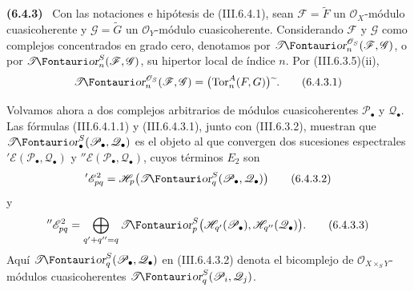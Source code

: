 \documentclass[10pt,oneside]{book}
\makeatletter
\newcommand{\sh}[1]{\mathscr{#1}}
\newcommand*{\ega@sheafop}[3]{\sh{#1}#2\textup{\kern-2.2pt{\Fontauri\slshape #3}}}
\newcommand{\shTor}{\ega@sheafop{T}{}{or}}
\newcommand{\supertilde}{{\,\widetilde{\,}\,}}
\newcommand{\Tor}{\operatorname{Tor}}
\newcommand{\sref}[2][]{\textup{(#2)}}
\newenvironment{env}[1][]{\par\medskip\noindent\textbf{(#1)}\ }{\par}
\makeatother
\begin{document}
\begin{env}[6.4.3]
\label{III.6.4.3}
Con las notaciones e hipótesis de \sref{III.6.4.1}, sean
$\sh F=\widetilde F$ un $\sh O_X$-módulo cuasicoherente y
$\sh G=\widetilde G$ un $\sh O_Y$-módulo cuasicoherente.
Considerando $\sh F$ y $\sh G$ como complejos concentrados en
grado cero, denotamos por $\shTor_n^{\sh O_S}(\sh F,\sh G)$, o
por $\shTor_n^S(\sh F,\sh G)$, su hipertor local de índice $n$.
Por \sref{III.6.3.5}(ii),
\[
  \shTor_n^{\sh O_S}(\sh F,\sh G)
  =
  \bigl(\Tor_n^A(F,G)\bigr)\supertilde.
  \tag{6.4.3.1}\label{III.6.4.3.1}
\]

Volvamos ahora a dos complejos arbitrarios de módulos
cuasicoherentes $\sh P_\bullet$ y $\sh Q_\bullet$. Las fórmulas
\sref{III.6.4.1.1} y \sref{III.6.4.3.1}, junto con
\sref{III.6.3.2}, muestran que
$\boldsymbol{\shTor}_\bullet^S(\sh P_\bullet,\sh Q_\bullet)$ es el objeto al
que convergen dos sucesiones espectrales
$'\sh E(\sh P_\bullet,\sh Q_\bullet)$ y
$''\sh E(\sh P_\bullet,\sh Q_\bullet)$, cuyos términos $E_2$ son
\[
  '\sh E_{pq}^2
  =
  \sh H_p\bigl(\shTor_q^S(\sh P_\bullet,\sh Q_\bullet)\bigr)
  \tag{6.4.3.2}\label{III.6.4.3.2}
\]
y
\[
  ''\sh E_{pq}^2
  =
  \bigoplus_{q'+q''=q}
  \shTor_p^S
  \bigl(\sh H_{q'}(\sh P_\bullet),
        \sh H_{q''}(\sh Q_\bullet)\bigr).
  \tag{6.4.3.3}\label{III.6.4.3.3}
\]
Aquí $\shTor_q^S(\sh P_\bullet,\sh Q_\bullet)$ en
\sref{III.6.4.3.2} denota el bicomplejo de
$\sh O_{X\times_SY}$-módulos cuasicoherentes
$\shTor_q^S(\sh P_i,\sh Q_j)$.
\end{env}
\end{document}
